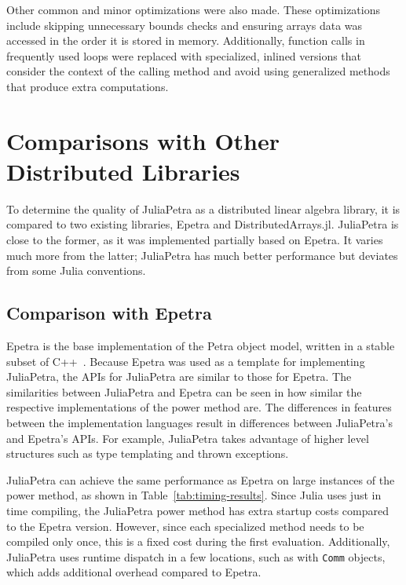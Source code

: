 \documentclass[acmsmall]{acmart}
\newcommand{\snippet}[1]{\lstinline{#1}}
\begin{document}
	Other common and minor optimizations were also made.
	These optimizations include skipping unnecessary bounds checks
	and ensuring arrays data was accessed in the order it is stored in memory.
	Additionally, function calls in frequently used loops were replaced with specialized, inlined versions that consider the context of the calling method and avoid using generalized methods that produce extra computations.
	
	\section{Comparisons with Other Distributed Libraries}
	
	To determine the quality of JuliaPetra as a distributed linear algebra library, it is compared to two existing libraries, Epetra and DistributedArrays.jl.
	JuliaPetra is close to the former, as it was implemented partially based on Epetra.
	It varies much more from the latter; JuliaPetra has much better performance but deviates from some Julia conventions.
	
	\subsection{Comparison with Epetra}
	
	Epetra is the base implementation of the Petra object model,
	written in a stable subset of C++~\cite{Heroux:2005:Trilinos}.
	Because Epetra was used as a template for implementing JuliaPetra,
	the APIs for JuliaPetra are similar to those for Epetra.
	The similarities between JuliaPetra and Epetra can be seen in how similar the respective implementations
	of the power method are.
	The differences in features between the implementation languages result in differences
	between JuliaPetra's and Epetra's APIs.
	For example, JuliaPetra takes advantage of higher level structures
	such as type templating and thrown exceptions.
	
	JuliaPetra can achieve the same performance as Epetra on large instances of the power method, as shown in Table~\ref{tab:timing-results}.
	Since Julia uses just in time compiling, the JuliaPetra power method has extra startup costs compared to
	the Epetra version. However, since each specialized method needs to be compiled only once,
	this is a fixed cost during the first evaluation.
	Additionally, JuliaPetra uses runtime dispatch in a few locations, such as with
	\snippet{Comm} objects, which adds additional overhead compared to Epetra.
	
\end{document}
